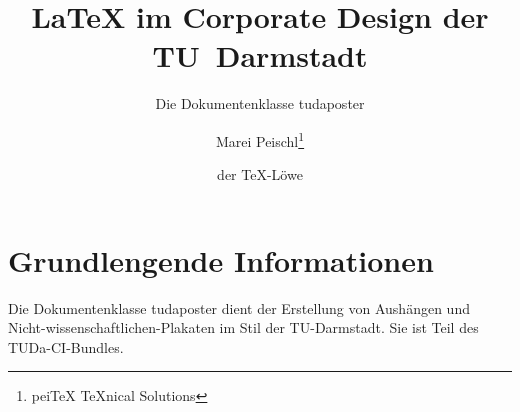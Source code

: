 \documentclass[
	paper=a0,
	ngerman,
	accentcolor=9c,
	logo=body,%
	footer=true,
	]{tudaposter}
\begin{document}
\title{\LaTeX{} im Corporate Design der TU~Darmstadt}
\subtitle{Die Dokumentenklasse tudaposter}
\author{Marei Peischl\thanks{pei\TeX{} \TeX{}nical Solutions}\and der \TeX-Löwe}

\titlegraphic{\color{red!20}\rule{\contentwidth}{.3\contentheight}}



\maketitle

\section*{Grundlengende Informationen}
Die Dokumentenklasse tudaposter dient der Erstellung von Aushängen und Nicht-wissenschaftlichen-Plakaten im Stil der TU-Darmstadt. Sie ist Teil des TUDa-CI-Bundles.
\end{document}
